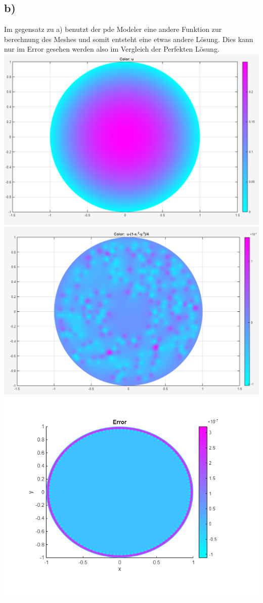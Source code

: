 \documentclass{scrartcl}
\begin{document}
\subsection*{b)}
Im gegensatz zu a) benutzt der pde Modeler eine andere Funktion zur berechnung des Meshes und somit entsteht eine etwas andere Lösung. Dies kann nur im Error gesehen werden also im Vergleich der Perfekten Lösung.\\
\includegraphics[scale=0.5]{Poisson1bplot.png}\\
\includegraphics[scale=0.3]{Poisson1aplotERROR.png}
\includegraphics[scale=0.4]{Poisson1aplot2error.png}\\
\end{document}
